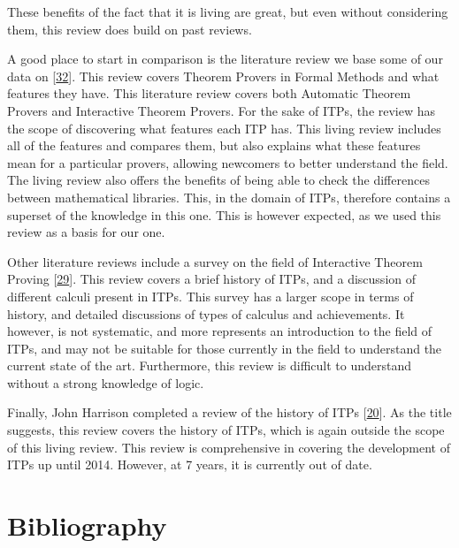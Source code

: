 \documentclass[
]{article}
\begin{document}
These benefits of the fact that it is living are great, but even without
considering them, this review does build on past reviews.

A good place to start in comparison is the literature review we base
some of our data on {[}\protect\hyperlink{ref-nawaz_survey_2019}{32}{]}.
This review covers Theorem Provers in Formal Methods and what features
they have. This literature review covers both Automatic Theorem Provers
and Interactive Theorem Provers. For the sake of ITPs, the review has
the scope of discovering what features each ITP has. This living review
includes all of the features and compares them, but also explains what
these features mean for a particular provers, allowing newcomers to
better understand the field. The living review also offers the benefits
of being able to check the differences between mathematical libraries.
This, in the domain of ITPs, therefore contains a superset of the
knowledge in this one. This is however expected, as we used this review
as a basis for our one.

Other literature reviews include a survey on the field of Interactive
Theorem Proving {[}\protect\hyperlink{ref-a_survey_of_itp}{29}{]}. This
review covers a brief history of ITPs, and a discussion of different
calculi present in ITPs. This survey has a larger scope in terms of
history, and detailed discussions of types of calculus and achievements.
It however, is not systematic, and more represents an introduction to
the field of ITPs, and may not be suitable for those currently in the
field to understand the current state of the art. Furthermore, this
review is difficult to understand without a strong knowledge of logic.

Finally, John Harrison completed a review of the history of ITPs
{[}\protect\hyperlink{ref-history_of_itps}{20}{]}. As the title
suggests, this review covers the history of ITPs, which is again outside
the scope of this living review. This review is comprehensive in
covering the development of ITPs up until 2014. However, at 7 years, it
is currently out of date.

\hypertarget{bibliography}{%
\section*{Bibliography}\label{bibliography}}
\end{document}
